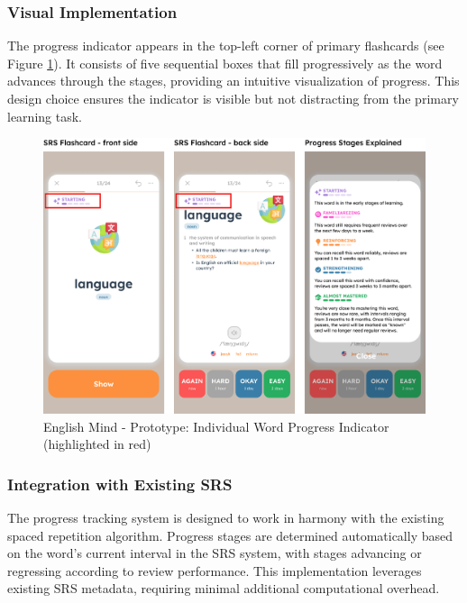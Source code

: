 \subsubsection{Visual Implementation}

The progress indicator appears in the top-left corner of primary flashcards (see Figure \ref{fig:em-prototype-word-progress}). It consists of five sequential boxes that fill progressively as the word advances through the stages, providing an intuitive visualization of progress. This design choice ensures the indicator is visible but not distracting from the primary learning task.

\begin{figure}[!h]
    \includegraphics[width=1\textwidth]{src/figures/em-prototype-progress-system.png}
    \caption{English Mind - Prototype: Individual Word Progress Indicator (highlighted in red)}
    \label{fig:em-prototype-word-progress}
\end{figure}

\subsubsection{Integration with Existing SRS}

The progress tracking system is designed to work in harmony with the existing spaced repetition algorithm. Progress stages are determined automatically based on the word's current interval in the SRS system, with stages advancing or regressing according to review performance. This implementation leverages existing SRS metadata, requiring minimal additional computational overhead.


